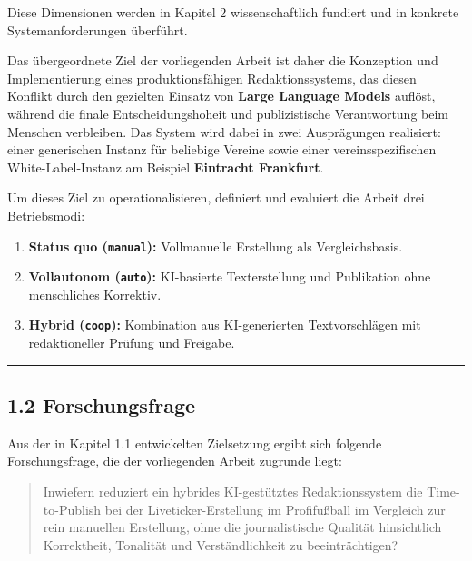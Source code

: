 Diese Dimensionen werden in Kapitel 2 wissenschaftlich fundiert und in
konkrete Systemanforderungen überführt.

Das übergeordnete Ziel der vorliegenden Arbeit ist daher die Konzeption
und Implementierung eines produktionsfähigen Redaktionssystems, das
diesen Konflikt durch den gezielten Einsatz von \textbf{Large Language
Models} auflöst, während die finale Entscheidungshoheit und
publizistische Verantwortung beim Menschen verbleiben. Das System wird
dabei in zwei Ausprägungen realisiert: einer generischen Instanz für
beliebige Vereine sowie einer vereinsspezifischen White-Label-Instanz am
Beispiel \textbf{Eintracht Frankfurt}.

Um dieses Ziel zu operationalisieren, definiert und evaluiert die Arbeit
drei Betriebsmodi:

\begin{enumerate}
\def\labelenumi{\arabic{enumi}.}
\tightlist
\item
  \textbf{Status quo (\passthrough{\lstinline!manual!}):} Vollmanuelle
  Erstellung als Vergleichsbasis.
\item
  \textbf{Vollautonom (\passthrough{\lstinline!auto!}):} KI-basierte
  Texterstellung und Publikation ohne menschliches Korrektiv.
\item
  \textbf{Hybrid (\passthrough{\lstinline!coop!}):} Kombination aus
  KI-generierten Textvorschlägen mit redaktioneller Prüfung und
  Freigabe.
\end{enumerate}

\begin{center}\rule{0.5\linewidth}{0.5pt}\end{center}

\subsection{1.2 Forschungsfrage}\label{forschungsfrage}

Aus der in Kapitel 1.1 entwickelten Zielsetzung ergibt sich folgende
Forschungsfrage, die der vorliegenden Arbeit zugrunde liegt:

\begin{quote}
Inwiefern reduziert ein hybrides KI-gestütztes Redaktionssystem die
Time-to-Publish bei der Liveticker-Erstellung im Profifußball im
Vergleich zur rein manuellen Erstellung, ohne die journalistische
Qualität hinsichtlich Korrektheit, Tonalität und Verständlichkeit zu
beeinträchtigen?
\end{quote}

